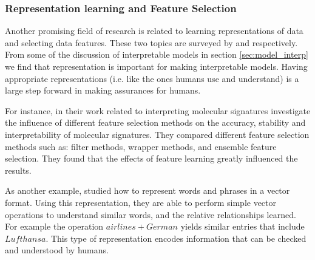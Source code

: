 \subsubsection{Representation learning and Feature Selection} \label{sec:rep_learning}
    Another promising field of research is related to learning representations of data and selecting data features. These two topics are surveyed by \citet{Bengio2013-uv} and \citet{Guyon2003-fj} respectively. From some of the discussion of interpretable models in section \ref{sec:model_interp} we find that representation is important for making interpretable models. Having appropriate representations (i.e. like the ones humans use and understand) is a large step forward in making assurances for humans.

    For instance, in their work related to interpreting molecular signatures \citet{Haury2011-zi} investigate the influence of different feature selection methods on the accuracy, stability and interpretability of molecular signatures. They compared different feature selection methods such as: filter methods, wrapper methods, and ensemble feature selection. They found that the effects of feature learning greatly influenced the results. 

    As another example, \citet{Mikolov2013-lt} studied how to represent words and phrases in a vector format. Using this representation, they are able to perform simple vector operations to understand similar words, and the relative relationships learned. For example the operation $airlines+German$ yields similar entries that include $Lufthansa$. This type of representation encodes information that can be checked and understood by humans. 
    
